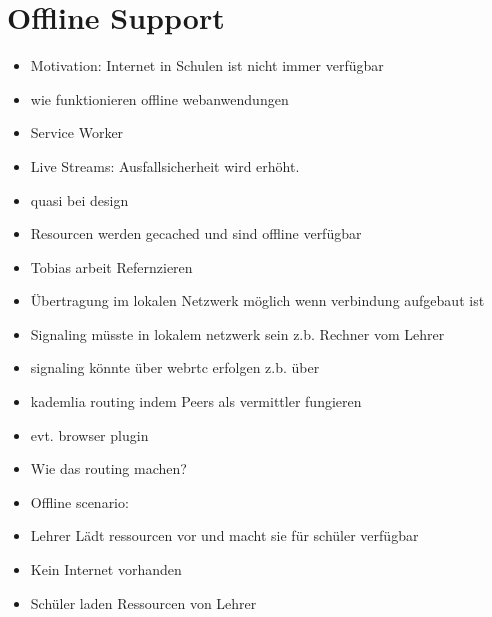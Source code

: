 \section{Offline Support}
\begin{itemize}
	\item Motivation: Internet in Schulen ist nicht immer verfügbar
	\item wie funktionieren offline webanwendungen
	\item Service Worker
	\item Live Streams: Ausfallsicherheit wird erhöht.
	\item quasi bei design
	\item Resourcen werden gecached und sind offline verfügbar
	\item Tobias arbeit Refernzieren
	\item Übertragung im lokalen Netzwerk möglich wenn verbindung aufgebaut ist
	\item Signaling müsste in lokalem netzwerk sein z.b. Rechner vom Lehrer
	\item signaling könnte über webrtc erfolgen z.b. über 
	\item kademlia routing indem Peers als vermittler fungieren
	\item 	evt. browser plugin
	\item 	Wie das routing machen?
	\item Offline scenario:
	\item 	Lehrer Lädt ressourcen vor und macht sie für schüler verfügbar
	\item 	Kein Internet vorhanden
	\item 	Schüler laden Ressourcen von Lehrer
\end{itemize}

